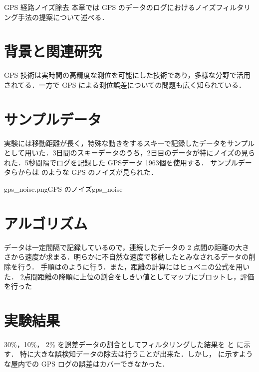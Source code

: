 \chapterhead
{GPS 経路ノイズ除去}
{本章では GPS のデータのログにおけるノイズフィルタリング手法の提案について述べる．}


\section{背景と関連研究}
GPS 技術は実時間の高精度な測位を可能にした技術であり，多様な分野で活用されてる．一方で GPS による測位誤差についての問題も広く知られている\cite{gps_wrong}．

\section{サンプルデータ}
実験には移動距離が長く，特殊な動きをするスキーで記録したデータをサンプルとして用いた．3日間のスキーデータのうち，2日目のデータが特にノイズの見られた．5秒間隔でログを記録した GPSデータ 1963個を使用する．
サンプルデータらからは のような GPS のノイズが見られた．

% 
{gps_noise.png}{GPS のノイズ}{gps_noise}









\section{アルゴリズム}
データは一定間隔で記録しているので，連続したデータの 2 点間の距離の大きさから速度が求まる．明らかに不自然な速度で移動したとみなされるデータの削除を行う．
手順はのように行う．また，距離の計算にはヒュベニの公式を用いた．
2点間距離の降順に上位の割合をしきい値としてマップにプロットし，評価を行った







\section{実験結果}
30\%，10\%， 2\% を誤差データの割合としてフィルタリングした結果を と  に示す．
特に大きな誤検知データの除去は行うことが出来た．しかし， に示すような屋内での GPS ログの誤差はカバーできなかった．

